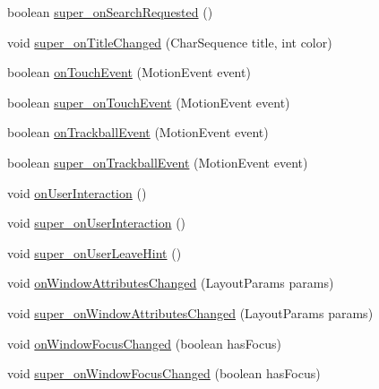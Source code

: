 \begin{DoxyCompactItemize}
\item 
boolean \hyperlink{classorg_1_1kde_1_1necessitas_1_1origo_1_1_qt_activity_acd1012ea18d7a2a87f3e127e8a991b0b}{super\-\_\-on\-Search\-Requested} ()
\item 
void \hyperlink{classorg_1_1kde_1_1necessitas_1_1origo_1_1_qt_activity_a899e6c88e95cb5af10b3a3ef5de51a4e}{super\-\_\-on\-Title\-Changed} (Char\-Sequence title, int color)
\item 
boolean \hyperlink{classorg_1_1kde_1_1necessitas_1_1origo_1_1_qt_activity_ad625ed7f98c44bcfb9ff38d37c3f1a40}{on\-Touch\-Event} (Motion\-Event event)
\item 
boolean \hyperlink{classorg_1_1kde_1_1necessitas_1_1origo_1_1_qt_activity_a0143b0fde87c08997f0b2e07261221ad}{super\-\_\-on\-Touch\-Event} (Motion\-Event event)
\item 
boolean \hyperlink{classorg_1_1kde_1_1necessitas_1_1origo_1_1_qt_activity_aae6d32b88d404653b5946670820323d9}{on\-Trackball\-Event} (Motion\-Event event)
\item 
boolean \hyperlink{classorg_1_1kde_1_1necessitas_1_1origo_1_1_qt_activity_ad1718dba3426950eea0bb8987eeb07a2}{super\-\_\-on\-Trackball\-Event} (Motion\-Event event)
\item 
void \hyperlink{classorg_1_1kde_1_1necessitas_1_1origo_1_1_qt_activity_a8069d73567a81dc675d5378a6f9fec27}{on\-User\-Interaction} ()
\item 
void \hyperlink{classorg_1_1kde_1_1necessitas_1_1origo_1_1_qt_activity_a58a0e91bb9679427f37645a6bc192ac2}{super\-\_\-on\-User\-Interaction} ()
\item 
void \hyperlink{classorg_1_1kde_1_1necessitas_1_1origo_1_1_qt_activity_a34b564fd52539b8dcb9a1abb21dabb8a}{super\-\_\-on\-User\-Leave\-Hint} ()
\item 
void \hyperlink{classorg_1_1kde_1_1necessitas_1_1origo_1_1_qt_activity_aaf31349e01a5718b64008437cca1d0af}{on\-Window\-Attributes\-Changed} (Layout\-Params params)
\item 
void \hyperlink{classorg_1_1kde_1_1necessitas_1_1origo_1_1_qt_activity_a8405ee3366f9ea1d51ec529ff5c8349d}{super\-\_\-on\-Window\-Attributes\-Changed} (Layout\-Params params)
\item 
void \hyperlink{classorg_1_1kde_1_1necessitas_1_1origo_1_1_qt_activity_a6edb0388b940e87601effda56e14adf6}{on\-Window\-Focus\-Changed} (boolean has\-Focus)
\item 
void \hyperlink{classorg_1_1kde_1_1necessitas_1_1origo_1_1_qt_activity_ae9f86d811f63a8729dcc7bd7b4c729ea}{super\-\_\-on\-Window\-Focus\-Changed} (boolean has\-Focus)

\end{DoxyCompactItemize}
